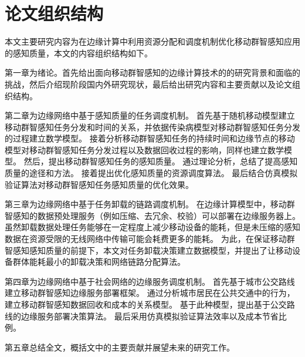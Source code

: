 \section{论文组织结构}


本文主要研究内容为在边缘计算中利用资源分配和调度机制优化移动群智感知应用的感知质量，本文的内容组织结构如下。

第一章为绪论。首先给出面向移动群智感知的边缘计算技术的的研究背景和面临的挑战，然后介绍现阶段国内外研究现状，最后给出研究内容和主要贡献以及论文组织结构。


第二章为边缘网络中基于感知质量的任务调度机制。
首先基于随机移动模型建立移动群智感知任务分发和时间的关系，并依据传染病模型对移动群智感知任务分发的过程建立数学模型。
接着分析移动群智感知任务的持续时间和边缘节点的移动模型对移动群智感知任务分发过程以及数据回收过程的影响，同样也建立数学模型。
然后，提出移动群智感知任务的感知质量。
通过理论分析，总结了提高感知质量的途径和方法。
接着提出优化感知质量的资源调度算法。
最后结合仿真模拟验证算法对移动群智感知任务感知质量的优化效果。

第三章为边缘网络中基于任务卸载的链路调度机制。
在边缘计算模型中，移动群智感知的数据预处理服务（例如压缩、去冗余、校验）可以部署在边缘服务器上。
虽然卸载数据处理任务能够在一定程度上减少移动设备的能耗，但是未压缩的感知数据在资源受限的无线网络中传输可能会耗费更多的能耗。
为此，在保证移动群智感知感知质量的前提下，本文对任务卸载决策建立数据模型，并提出了让移动设备群体能耗最小的卸载决策和网络链路分配算法。

第四章为边缘网络中基于社会网络的边缘服务调度机制。
首先基于城市公交路线建立移动群智感知边缘服务部署框架。
通过分析城市居民在公共交通中的行为，建立移动群智感知数据回收和成本的关系模型。
基于此种模型，提出基于公交路线的边缘服务部署决策算法。
最后采用仿真模拟验证算法效率以及成本节省比例。

第五章总结全文，概括文中的主要贡献并展望未来的研究工作。
